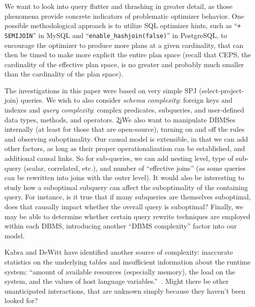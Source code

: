\documentclass[prodmode,acmtods]{acmsmall}
\begin{document}
We want to look into query flutter and thrashing in greater detail, as those phenomena
provide concrete indicators of problematic optimizer behavior. One
possible methodological approach is to utilize SQL optimizer hints, such as
``{\tt \*+ SEMIJOIN}'' in MySQL and ``{\tt enable\_hashjoin(false)}'' in PostgreSQL,
to encourage the optimizer to produce more plans at a given cardinality,
that can then be timed to make more explicit the entire plan space (recall that
CEPS, the cardinality of the effective plan space, is no greater and
probably much smaller than the cardinality of the plan space).

The investigations in this paper were based on very simple SPJ (select-project-join)
queries.  We wish to also consider {\em schema complexity}: 
foreign keys and indexes and {\em query complexity}: complex predicates, subqueries,
and user-defined data types, methods, and operators. \c2j{}{We also want
  to manipulate \hbox{DBMSes} internally (at least for those that are open-source),
  turning on and off the rules and observing suboptimality.} Our causal
model is extensible, in that we can add other factors, as long as their proper
operationalization can be established, and additional causal links.
So for
sub-queries, we can add nesting level, type of sub-query (scalar,
correlated, etc.), and number of ``effective joins''  (as some queries can
be rewritten into joins with the outer level).
It would also be interesting to study how a suboptimal subquery can affect
the suboptimality of the containing query.  For instance, is it true that if
many subqueries are themselves suboptimal, does that causally impact whether
the overall query is suboptimal? Finally, we may be able to determine
whether certain query rewrite techniques are employed within each \hbox{DBMS},
introducing another ``\hbox{DBMS} complexity'' factor into our model.

Kabra and
\hbox{DeWitt} have identified another source of complexity: inaccurate
statistics on the underlying tables and insufficient information about the
runtime system: ``amount of available resources (especially memory), the
load on the system, and the values of host language
variables.''~\cite[p.~106]{kabra98}.  Might there be other unanticipated
interactions, that are unknown simply because they haven't been
looked for?

\end{document}
